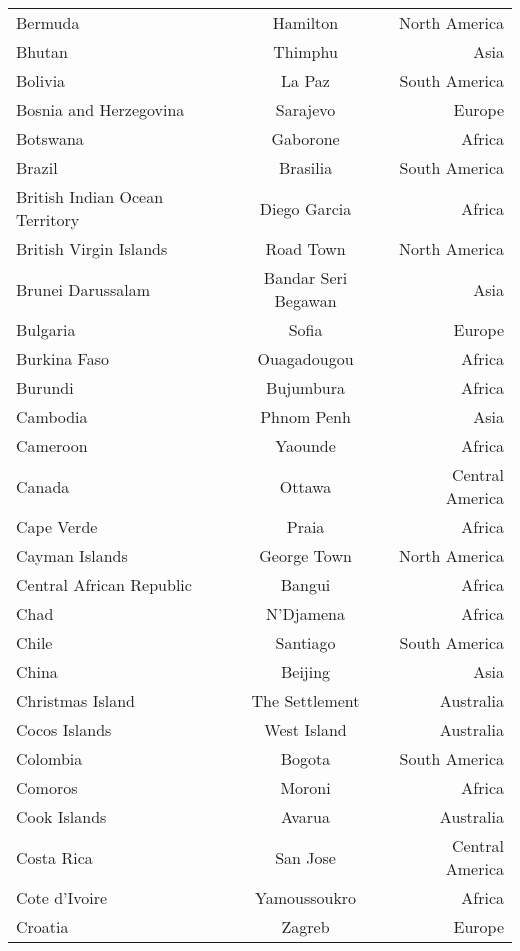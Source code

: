 \begin{longtable}{l|c|r}
Bermuda         & Hamilton          & North America\\
Bhutan          & Thimphu           & Asia\\
Bolivia	        & La Paz            & South America\\
Bosnia and Herzegovina & Sarajevo   & Europe\\
Botswana        & Gaborone          & Africa\\
Brazil          & Brasilia          & South America\\
British Indian Ocean Territory & Diego Garcia & Africa\\
British Virgin Islands & Road Town  & North America\\
Brunei Darussalam & Bandar Seri Begawan & Asia\\
Bulgaria        & Sofia             & Europe\\
Burkina Faso    & Ouagadougou       & Africa\\
Burundi	        & Bujumbura         & Africa\\
Cambodia        & Phnom Penh        & Asia\\
Cameroon        & Yaounde           & Africa\\
Canada          & Ottawa            & Central America\\
Cape Verde      & Praia             & Africa\\
Cayman Islands  & George Town       & North America\\
Central African Republic & Bangui   & Africa\\
Chad            & N’Djamena         & Africa\\
Chile           & Santiago          & South America\\
China           & Beijing           & Asia\\
Christmas Island & The Settlement   & Australia\\
Cocos Islands   & West Island       & Australia\\
Colombia        & Bogota            & South America\\
Comoros         & Moroni            & Africa\\
Cook Islands    & Avarua            & Australia\\
Costa Rica      & San Jose          & Central America\\
Cote d’Ivoire   & Yamoussoukro      & Africa\\
Croatia         & Zagreb            & Europe\\

\end{longtable}
